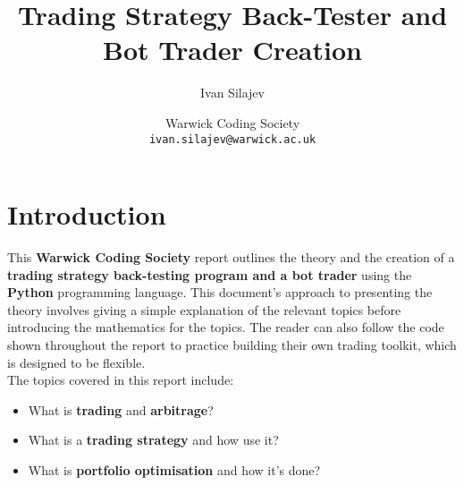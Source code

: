 \documentclass[11pt]{article}
\begin{document}
\begin{titlepage}
    
    \title{Trading Strategy Back-Tester and Bot Trader Creation}
    
    \author{Ivan Silajev}
    
    \date{
    Warwick Coding Society \\
    \texttt{ivan.silajev@warwick.ac.uk}
    }
    
    \maketitle
    
    \tableofcontents
    
\end{titlepage}

\section{Introduction}

This \textbf{Warwick Coding Society} report outlines the theory and the creation of a \textbf{trading strategy back-testing program and a bot trader} using the \textbf{Python} programming language. 
\nolinebreak
This document's approach to presenting the theory involves giving a simple explanation of the relevant topics before introducing the mathematics for the topics. 
\nolinebreak
The reader can also follow the code shown throughout the report to practice building their own trading toolkit, which is designed to be flexible.\\

The topics covered in this report include:
\begin{itemize}
    \item What is \textbf{trading} and \textbf{arbitrage}?
    \item What is a \textbf{trading strategy} and how use it?
    \item What is \textbf{portfolio optimisation} and how it's done?
\end{itemize}
\end{document}
